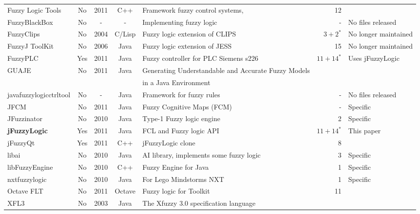 \documentclass[conference]{IEEEtran}
\begin{document}
\begin{table}[!t]
\begin{tabular}{|l|c|c|c|l|r|l|}
		Fuzzy Logic Tools
			& No
			& 2011
			& C++
			& Framework fuzzy control systems,
			& 12
			& 
			\\

		FuzzyBlackBox
			& No
			& -
			& -
			& Implementing fuzzy logic
			& -
			& No files released
			\\
			
		FuzzyClips			
			& No	
			& 2004
			& C/Lisp
			& Fuzzy logic extension of CLIPS
			& $3 + 2^*$
			& No longer maintained
			\\

		FuzzyJ ToolKit		
			& No	
			& 2006 
			& Java
			& Fuzzy logic extension of JESS
			& 15
			& No longer maintained
			\\

		FuzzyPLC
			& Yes
			& 2011
			& Java
			& Fuzzy controller for PLC Siemens s226
			& $11 + 14^*$
			& Uses jFuzzyLogic
			\\
			
		GUAJE 				
			& No
			& 2011
			& Java
			& Generating Understandable and Accurate Fuzzy Models 
			& 
			& 
			\\
			& 
			& 
			& 
			&  in a Java Environment
			& 
			& 
			\\
                             
		javafuzzylogicctrltool
			& No
			& -
			& Java
			& Framework for fuzzy rules
			& -
			& No files released
			\\
			
		JFCM
			& No
			& 2011
			& Java
			& Fuzzy Cognitive Maps (FCM)
			& -
			& Specific
			\\

		JFuzzinator
			& No
			& 2010
			& Java
			& Type-1 Fuzzy logic engine
			& 2
			& Specific
			\\
						
		\textbf{jFuzzyLogic}
			& Yes	
			& 2011 
			& Java
			& FCL and Fuzzy logic API
			& $11 + 14^*$
			& This paper 
			\\

		jFuzzyQt			
			& Yes	
			& 2011 
			& C++
			& jFuzzyLogic clone 
			& 8
			& 
			\\
			
		libai				
			& No	
			& 2010 
			& Java 
			& AI library, implements some fuzzy logic 
			& 3
			& Specific
			\\
			
		libFuzzyEngine
			& No
			& 2010
			& C++
			& Fuzzy Engine for Java
			& 1
			& Specific
			\\
			
		nxtfuzzylogic
			& No
			& 2010
			& Java
			& For Lego Mindstorms NXT
			& 1
			& Specific
			\\
			
		Octave FLT
			& No
			& 2011
			& Octave
			& Fuzzy logic for Toolkit
			& 11
			& 
			\\

		XFL3
			& No
			& 2003
			& Java
			& The Xfuzzy 3.0 specification language
			& 
			& 
			\\
			
		\hline
	\end{tabular}
\end{table}
\end{document}
